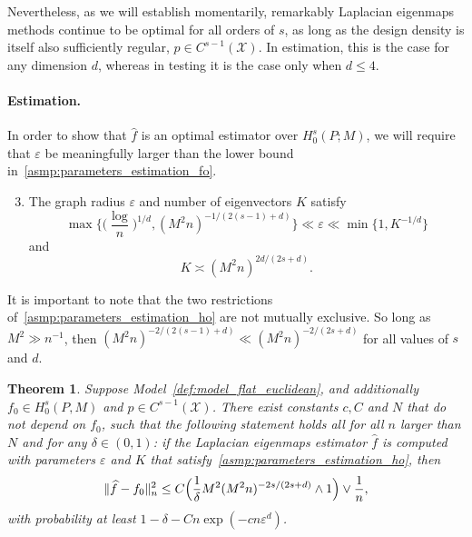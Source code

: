 \documentclass{article}
\newcommand{\1}{\mathbf{1}}
\newcommand{\mc}[1]{\mathcal{#1}}
\newcommand{\wh}[1]{\widehat{#1}}
\theoremstyle{alden}
\theoremstyle{aldenthm}
\newtheorem{theorem}{Theorem}
\theoremstyle{definition}
\theoremstyle{remark}
\begin{document}
Nevertheless, as we will establish momentarily, remarkably Laplacian eigenmaps methods continue to be optimal for all orders of $s$, as long as the design density is itself also sufficiently regular, $p \in C^{s - 1}(\mc{X})$. In estimation, this is the case for any dimension $d$, whereas in testing it is the case only when $d \leq 4$. 

\paragraph{Estimation.}
In order to show that $\wh{f}$ is an optimal estimator over $H_0^s(P;M)$, we will require that $\varepsilon$ be meaningfully larger than the lower bound in~\ref{asmp:parameters_estimation_fo}.
\begin{enumerate}[label=(A\arabic*)]
	\setcounter{enumi}{2}
	\item 
	\label{asmp:parameters_estimation_ho}
	The graph radius $\varepsilon$ and number of eigenvectors $K$ satisfy
	\begin{equation}
	\label{eqn:radius_ho}
	\max\biggl\{\biggl(\frac{\log}{n}\biggr)^{1/d}, (M^2n)^{-1/(2(s - 1) + d)}\biggr\} \ll \varepsilon \ll \min\{1, K^{-1/d}\}
	\end{equation}
	and
	\begin{equation*}
	K \asymp (M^2n)^{2d/(2s + d)}.
	\end{equation*}
\end{enumerate}
It is important to note that the two restrictions of~\ref{asmp:parameters_estimation_ho} are not mutually exclusive. So long as $M^2 \gg n^{-1}$, then $(M^2n)^{-2/(2(s - 1) + d)} \ll (M^2n)^{-2/(2s + d)}$ for all values of $s$ and $d$.
\begin{theorem}
	\label{thm:laplacian_eigenmaps_estimation_ho}
	Suppose Model~\ref{def:model_flat_euclidean}, and additionally $f_0 \in H_0^s(P,M)$ and $p \in C^{s - 1}(\mc{X})$. There exist constants $c,C$ and $N$ that do not depend on $f_0$, such that the following statement holds all for all $n$ larger than $N$ and for any $\delta \in (0,1)$: if the Laplacian eigenmaps estimator $\wh{f}$ is computed with parameters $\varepsilon$ and $K$ that satisfy~\ref{asmp:parameters_estimation_ho}, then
	\begin{equation}
	\label{eqn:laplacian_eigenmaps_estimation_ho}
	\|\wh{f} - f_0\|_n^2 \leq C\Bigl(\frac{1}{\delta}M^2(M^2n)^{-2s/(2s + d)} \wedge 1\Bigr) \vee \frac{1}{n},
	\end{equation}
	with probability at least $1 - \delta - Cn\exp(-cn\varepsilon^d)$.
\end{theorem}
\end{document}
